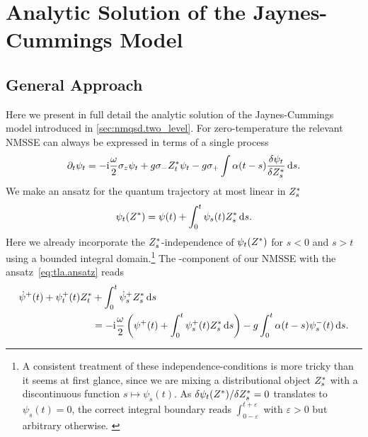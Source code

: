 \chapter{Analytic Solution of the Jaynes-Cummings Model}
\label{cha:tla}

\section{General Approach}
\label{sec:tla.general}

Here we present in full detail the analytic solution of the Jaynes-Cummings model introduced in \autoref{sec:nmqsd.two_level}.
For zero-temperature the relevant NMSSE can always be expressed in terms of a single process
\begin{equation}
  \partial_t \psi_t = -\mathrm{i}\frac{\omega}{2}\sigma_z\psi_t + g \sigma_- {Z}^*_t \psi_t - g\sigma_+ \int \alpha(t - s) \frac{\delta\psi_t}{\delta {Z}^*_s} \, \mathrm{d} s.
  \label{eq:tla.nmsse_twolevel}
\end{equation}
We make an ansatz for the quantum trajectory at most linear in ${Z}^*_s$
\begin{equation}
  \psitZ = \psi(t) + \int_0^t \psi_s(t) \ZZ_s \dd s.
  \label{eq:tla.ansatz}
\end{equation}
Here we already incorporate the ${Z}^*_s$-independence of $\psitZ$ for $s < 0$ and $s>t$ using a bounded integral domain.\footnote{%
  A consistent treatment of these independence-conditions is more tricky than it seems at first glance, since we are mixing a distributional object ${Z}^*_s$ with a discontinuous function $s \mapsto \psi_s(t)$.
  As $\delta \psi_t({Z}^*) / \delta {Z}^*_s = 0$ translates to $\psi_s(t) = 0$, the correct integral boundary reads $\int_{0-\varepsilon}^{t+\varepsilon}$ with $\varepsilon > 0$ but arbitrary otherwise.
  \label{fn:tla.boundaries}
}
The \quotes{+}-component of our NMSSE with the ansatz~\ref{eq:tla.ansatz} reads
\begin{align}
  \dot\psi^+(t) + \psi^+_t(t){Z}^*_t &+ \int_0^t \dot\psi^+_s{Z}^*_s \, \mathrm{d} s \nonumber\\
  &= -\mathrm{i} \frac{\omega}{2} \left( \psi^+(t) + \int_0^t \psi^+_s(t){Z}^*_s \, \mathrm{d} s \right) - g \int_0^t \alpha(t-s) \psi^-_s(t) \, \mathrm{d} s.
  \label{eq:tla.psi_plus}
\end{align}
